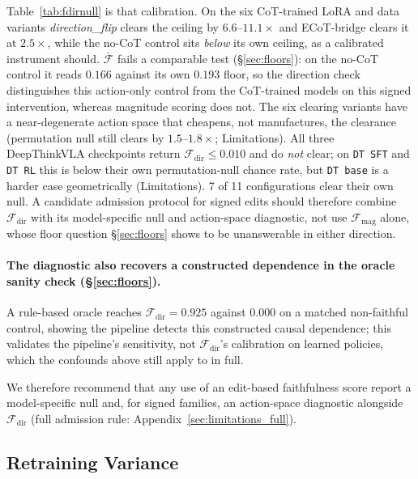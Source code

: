 \documentclass{article}
\begin{document}
Table~\ref{tab:fdirnull} is that calibration. On the six CoT-trained LoRA and data variants \emph{direction\_flip} clears the ceiling by $\mathbf{6.6}$--$\mathbf{11.1\times}$ and ECoT-bridge clears it at $2.5\times$, while the no-CoT control sits \emph{below} its own ceiling, as a calibrated instrument should. $\bar{\mathcal{F}}$ fails a comparable test (\S\ref{sec:floors}): on the no-CoT control it reads $0.166$ against its own $0.193$ floor, so the direction check distinguishes this action-only control from the CoT-trained models on this signed intervention, whereas magnitude scoring does not. The six clearing variants have a near-degenerate action space that cheapens, not manufactures, the clearance (permutation null still clears by $1.5$--$1.8\times$; Limitations). All three DeepThinkVLA checkpoints return $\mathcal{F}_{\text{dir}} \leq 0.010$ and do \emph{not} clear; on \texttt{DT SFT} and \texttt{DT RL} this is below their own permutation-null chance rate, but \texttt{DT base} is a harder case geometrically (Limitations). 7 of 11 configurations clear their own null. A candidate admission protocol for signed edits should therefore combine $\mathcal{F}_{\text{dir}}$ with its model-specific null and action-space diagnostic, not use $\mathcal{F}_{\text{mag}}$ alone, whose floor question \S\ref{sec:floors} shows to be unanswerable in either direction.

\paragraph{The diagnostic also recovers a constructed dependence in the oracle sanity check (\S\ref{sec:floors}).} A rule-based oracle reaches $\mathcal{F}_{\text{dir}}=0.925$ against $0.000$ on a matched non-faithful control, showing the pipeline detects this constructed causal dependence; this validates the pipeline's sensitivity, not $\mathcal{F}_{\text{dir}}$'s calibration on learned policies, which the confounds above still apply to in full.

We therefore recommend that any use of an edit-based faithfulness score report a model-specific null and, for signed families, an action-space diagnostic alongside $\mathcal{F}_{\text{dir}}$ (full admission rule: Appendix~\ref{sec:limitations_full}).

\subsection{Retraining Variance}
\label{sec:variance}
\end{document}

